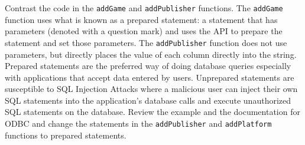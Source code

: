 \documentclass[12pt]{scrartcl}
\begin{document}
Contrast the code in the \texttt{addGame} and 
\texttt{addPublisher} functions.  The \texttt{addGame} 
function uses what is known as a prepared statement: a statement 
that has parameters (denoted with a question mark) and uses the 
API to prepare the statement and set those parameters.  The 
\texttt{addPublisher} function does not use parameters, but 
directly places the value of each column directly into the string.  
Prepared statements are the preferred way of doing database 
queries especially with applications that accept data entered by 
users.  Unprepared statements are susceptible to SQL Injection 
Attacks where a malicious user can inject their own SQL statements 
into the application's database calls and execute unauthorized 
SQL statements on the database.  Review the example and the 
documentation for ODBC and change the statements in the 
\texttt{addPublisher} and \texttt{addPlatform} 
functions to prepared statements.

	
\end{document}
